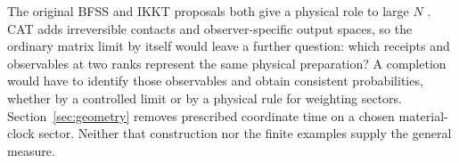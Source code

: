 The original BFSS and IKKT proposals both give a physical role to large \(N\) \cite{bfss,ikkt}. CAT adds irreversible contacts and observer-specific output spaces, so the ordinary matrix limit by itself would leave a further question: which receipts and observables at two ranks represent the same physical preparation? A completion would have to identify those observables and obtain consistent probabilities, whether by a controlled limit or by a physical rule for weighting sectors. Section~\ref{sec:geometry} removes prescribed coordinate time on a chosen material-clock sector. Neither that construction nor the finite examples supply the general measure.

